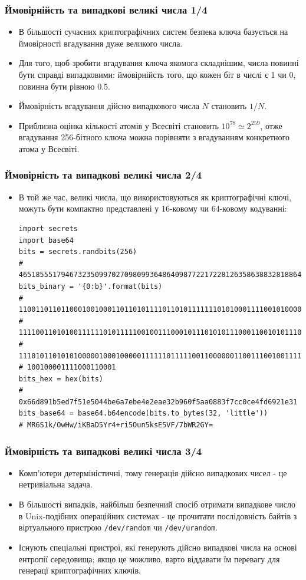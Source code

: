 \documentclass{beamer}
\begin{document}
\begin{frame}[fragile]
  \frametitle{Ймовірнійсть та випадкові великі числа 1/4}
  \begin{itemize}
  \item В більшості сучасних криптографічних систем безпека ключа базується на
    ймовірності вгадування дуже великого числа.
  \item Для того, щоб зробити вгадування ключа якомога складнішим, числа повинні
    бути справді випадковими: ймовірнійсть того, що кожен біт в числі є 1 чи 0,
    повинна бути рівною 0.5.
  \item Ймовірність вгадування дійсно випадкового числа $N$ становить $1/N$.
  \item Приблизна оцінка кількості атомів у Всесвіті становить $10^{78} \simeq
    2^{259}$, отже вгадування 256-бітного ключа можна порівняти з вгадуванням
    конкретного атома у Всесвіті.
  \end{itemize}
\end{frame}

\begin{frame}[fragile]
  \frametitle{Ймовірність та випадкові великі числа 2/4}
  \begin{itemize}
  \item В той же час, великі числа, що використовуються як криптографічні ключі,
    можуть бути компактно представлені у 16-ковому чи 64-ковому кодуванні:
\begin{verbatim}
import secrets
import base64
bits = secrets.randbits(256)
# 46518555179467323509970270980993648640987722172281263586388328188640792550961
bits_binary = '{0:b}'.format(bits)
# 110011011011000100100011011010111101101011111110101000111100101000001000100101\
# 111100110101001111110101111100100111000101110101011100011001010111001011000001\
# 111010110101010000010001000001111110111110011000000110011100100111111010110100\
# 100100001111000110001
bits_hex = hex(bits)
# 0x66d891b5ed7f51e5044be6a7ebe4e2eae32b960f5aa0883f7cc0ce4fd6921e31
bits_base64 = base64.b64encode(bits.to_bytes(32, 'little'))
# MR6S1k/OwHw/iKBaD5Yr4+ri5Oun5ksE5VF/7bWR2GY=
\end{verbatim}
  \end{itemize}
\end{frame}

\begin{frame}[fragile]
  \frametitle{Ймовірність та випадкові великі числа 3/4}
  \begin{itemize}
  \item Комп'ютери детерміністичні, тому генерація дійсно випадкових чисел - це
    нетривіальна задача.
  \item В більшості випадків, найбільш безпечний спосіб отримати випадкове число
    в Unix-подібних операційних системах - це прочитати послідовність байтів з
    віртуального пристрою \texttt{/dev/random} чи
    \texttt{/dev/urandom}.
  \item Існують спеціальні пристрої, які генерують дійсно випадкові числа на
    основі ентропії середовища; якщо це можливо, варто віддавати їм перевагу для
    генерацї криптографічних ключів.
  \end{itemize}
\end{frame}
\end{document}
